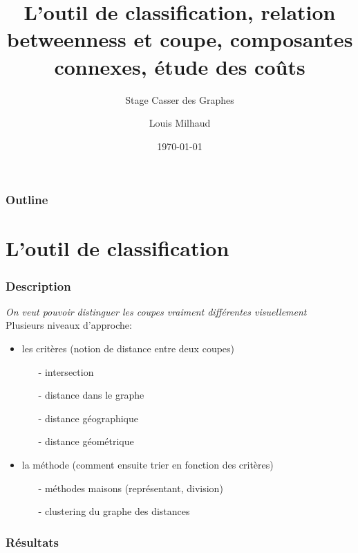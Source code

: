 \documentclass[aspectratio=169]{beamer}
\title{L'outil de classification, relation betweenness et coupe, composantes connexes, étude des coûts}
\subtitle{Stage Casser des Graphes}
\author{Louis Milhaud}
\institute{Complex Networks - LIP6}
\date{\today}
\begin{document}
    \begin{frame}
        \titlepage
    \end{frame}

    \begin{frame}
        \frametitle{Outline}
        \tableofcontents
    \end{frame}
    \section{L'outil de classification}
    \begin{frame}
        \frametitle{Description}
        \emph{On veut pouvoir distinguer les coupes vraiment différentes visuellement}\\
        Plusieurs niveaux d'approche:
        \begin{itemize}
            \item les critères (notion de distance entre deux coupes)
            \begin{itemize}
                \item[-] intersection
                \item[-] distance dans le graphe
                \item[-] distance géographique
                \item[-] distance géométrique    
            \end{itemize}
            \item la méthode (comment ensuite trier en fonction des critères)
            \begin{itemize}
                \item[-] méthodes maisons (représentant, division)
                \item[-] clustering du graphe des distances
            \end{itemize}
        \end{itemize}
    \end{frame}

    \begin{frame}
        \frametitle{Résultats}
    
        
    
    \end{frame}
\end{document}
